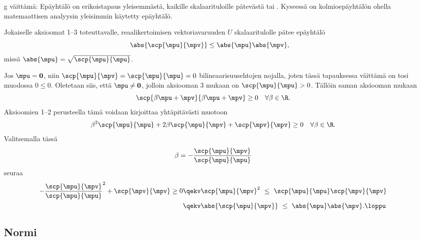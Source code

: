 g väittämä: Epäyhtälö on erikoistapaus yleisemmästä, kaikille 
skalaarituloille pätevästä  tai . Kyseessä on
kolmioepäyhtälön ohella matemaattisen analyysin yleisimmin käytetty epäyhtälö.
\begin{Lause}  \label{schwarzR}
 Jokaiselle aksioomat 1--3 toteuttavalle,
reaalikertoimisen vektoriavaruuden $U$ skalaaritulolle pätee epäyhtälö
\[
\abs{\scp{\mpu}{\mpv}} \le \abs{\mpu} \abs{\mpv}, \quad 
\]                            
missä $\abs{\mpu}=\sqrt{\scp{\mpu}{\mpu}}$.
\end{Lause}
\tod Jos $\mpu=\mathbf{0}$, niin $\scp{\mpu}{\mpv}=\scp{\mpu}{\mpu}=0$ bilineaarisuusehtojen
nojalla, joten tässä tapauksessa väittämä on tosi muodossa $0 \leq 0$. Oletetaan siis, että 
$\mpu \neq \mathbf{0}$, jolloin aksiooman 3 mukaan on $\scp{\mpu}{\mpu} > 0$. Tällöin saman 
aksiooman mukaan 
\[
\scp{\beta \mpu + \mpv}{\beta \mpu + \mpv} \geq 0 \quad \forall \beta \in \R.
\]
Aksioomien 1--2 perusteella tämä voidaan kirjoittaa yhtäpitävästi muotoon
\[
\beta^2\scp{\mpu}{\mpu} + 2 \beta \scp{\mpu}{\mpv} 
                        + \scp{\mpv}{\mpv} \geq 0 \quad \forall \beta \in \R.
\]
Valitsemalla tässä
\[
\beta=-\frac{\scp{\mpu}{\mpv}}{\scp{\mpu}{\mpu}}
\]
seuraa
\begin{align*}
-\frac{\scp{\mpu}{\mpv}}{\scp{\mpu}{\mpu}}^2+\scp{\mpv}{\mpv} \geq 0
            &\qekv \scp{\mpu}{\mpv}^2 \ \leq \ \scp{\mpu}{\mpu}\scp{\mpv}{\mpv} \\
            &\qekv \abs{\scp{\mpu}{\mpv}} \ \leq \ \abs{\mpu} \abs{\mpv}. \loppu
\end{align*}

\subsection{Normi}

